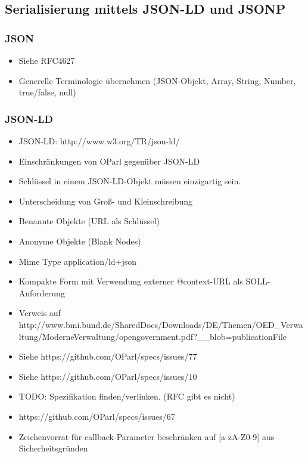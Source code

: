 \documentclass[,a4paper]{article}
\begin{document}
\subsection{Serialisierung mittels JSON-LD und JSONP}

\subsubsection{JSON}

\begin{itemize}
\item
  Siehe RFC4627
\item
  Generelle Terminologie übernehmen (JSON-Objekt, Array, String, Number,
  true/false, null)
\end{itemize}

\subsubsection{JSON-LD}

\begin{itemize}
\item
  JSON-LD: http://www.w3.org/TR/json-ld/
\item
  Einschränkungen von OParl gegenüber JSON-LD
\item
  Schlüssel in einem JSON-LD-Objekt müssen einzigartig sein.
\item
  Unterscheidung von Groß- und Kleinschreibung
\item
  Benannte Objekte (URL als Schlüssel)
\item
  Anonyme Objekte (Blank Nodes)
\item
  Mime Type application/ld+json
\item
  Kompakte Form mit Verwendung externer @context-URL als
  SOLL-Anforderung
\item
  Verweis auf
  http://www.bmi.bund.de/SharedDocs/Downloads/DE/Themen/OED\_Verwaltung/ModerneVerwaltung/opengovernment.pdf?\_\_blob=publicationFile
\item
  Siehe https://github.com/OParl/specs/issues/77
\item
  Siehe https://github.com/OParl/specs/issues/10
\end{itemize}


\begin{itemize}
\item
  TODO: Spezifikation finden/verlinken. (RFC gibt es nicht)
\item
  https://github.com/OParl/specs/issues/67
\item
  Zeichenvorrat für callback-Parameter beschränken auf {[}a-zA-Z0-9{]}
  aus Sicherheitsgründen
\end{itemize}
\end{document}
